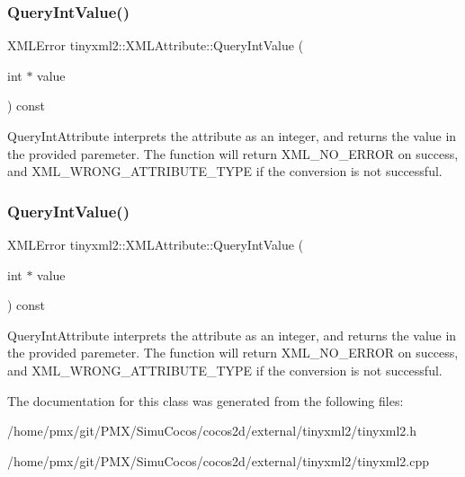 \subsubsection{\texorpdfstring{Query\+Int\+Value()}{QueryIntValue()}\hspace{0.1cm}{\footnotesize\ttfamily [1/2]}}
{\footnotesize\ttfamily X\+M\+L\+Error tinyxml2\+::\+X\+M\+L\+Attribute\+::\+Query\+Int\+Value (\begin{DoxyParamCaption}\item[{int $\ast$}]{value }\end{DoxyParamCaption}) const}

Query\+Int\+Attribute interprets the attribute as an integer, and returns the value in the provided paremeter. The function will return X\+M\+L\+\_\+\+N\+O\+\_\+\+E\+R\+R\+OR on success, and X\+M\+L\+\_\+\+W\+R\+O\+N\+G\+\_\+\+A\+T\+T\+R\+I\+B\+U\+T\+E\+\_\+\+T\+Y\+PE if the conversion is not successful. \mbox{\label{classtinyxml2_1_1XMLAttribute_a6d5176260db00ea301c01af8457cd993}} 
\subsubsection{\texorpdfstring{Query\+Int\+Value()}{QueryIntValue()}\hspace{0.1cm}{\footnotesize\ttfamily [2/2]}}
{\footnotesize\ttfamily X\+M\+L\+Error tinyxml2\+::\+X\+M\+L\+Attribute\+::\+Query\+Int\+Value (\begin{DoxyParamCaption}\item[{int $\ast$}]{value }\end{DoxyParamCaption}) const}

Query\+Int\+Attribute interprets the attribute as an integer, and returns the value in the provided paremeter. The function will return X\+M\+L\+\_\+\+N\+O\+\_\+\+E\+R\+R\+OR on success, and X\+M\+L\+\_\+\+W\+R\+O\+N\+G\+\_\+\+A\+T\+T\+R\+I\+B\+U\+T\+E\+\_\+\+T\+Y\+PE if the conversion is not successful. 

The documentation for this class was generated from the following files\+:\begin{DoxyCompactItemize}
\item 
/home/pmx/git/\+P\+M\+X/\+Simu\+Cocos/cocos2d/external/tinyxml2/tinyxml2.\+h\item 
/home/pmx/git/\+P\+M\+X/\+Simu\+Cocos/cocos2d/external/tinyxml2/tinyxml2.\+cpp\end{DoxyCompactItemize}
